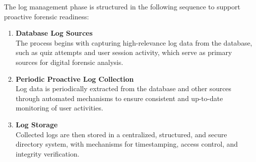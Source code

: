 The log management phase is structured in the following sequence to support proactive forensic readiness:

\begin{enumerate}
	\item \textbf{Database Log Sources} \\
	The process begins with capturing high-relevance log data from the database, such as quiz attempts and user session activity, which serve as primary sources for digital forensic analysis.
	
	\item \textbf{Periodic Proactive Log Collection} \\
	Log data is periodically extracted from the database and other sources through automated mechanisms to ensure consistent and up-to-date monitoring of user activities.
	
	\item \textbf{Log Storage} \\
	Collected logs are then stored in a centralized, structured, and secure directory system, with mechanisms for timestamping, access control, and integrity verification.
\end{enumerate}